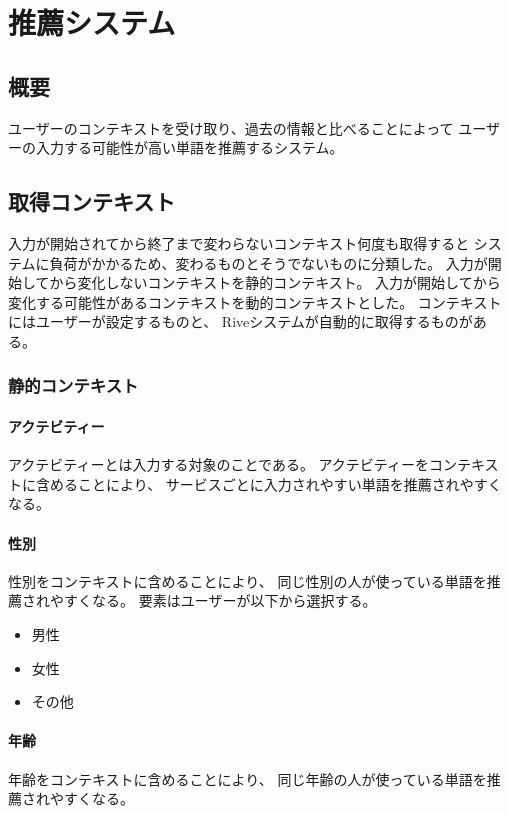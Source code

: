 \chapter{推薦システム}
\label{recommend}

\section{概要}

ユーザーのコンテキストを受け取り、過去の情報と比べることによって
ユーザーの入力する可能性が高い単語を推薦するシステム。

\section{取得コンテキスト}
\label{sec:getcontext}
入力が開始されてから終了まで変わらないコンテキスト何度も取得すると
システムに負荷がかかるため、変わるものとそうでないものに分類した。
入力が開始してから変化しないコンテキストを静的コンテキスト。
入力が開始してから変化する可能性があるコンテキストを動的コンテキストとした。
コンテキストにはユーザーが設定するものと、
Riveシステムが自動的に取得するものがある。

\subsection{静的コンテキスト}

\subsubsection{アクテビティー}
アクテビティーとは入力する対象のことである。
アクテビティーをコンテキストに含めることにより、
サービスごとに入力されやすい単語を推薦されやすくなる。

\subsubsection{性別}
性別をコンテキストに含めることにより、
同じ性別の人が使っている単語を推薦されやすくなる。
要素はユーザーが以下から選択する。
\begin{itemize}
  \item 男性
  \item 女性
  \item その他
\end{itemize}

\subsubsection{年齢}
年齢をコンテキストに含めることにより、
同じ年齢の人が使っている単語を推薦されやすくなる。

